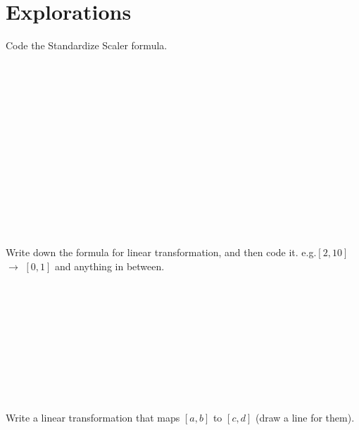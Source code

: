 \newpage
\section{Explorations}
\begin{outline}
    \1  Code the Standardize Scaler formula. \\
    \\
    \\
    \\
    \\
    \\
    \\
    \\
    \\
    \\
    \\
    \\
    \\
    \\
    \\
    \1  Write down the formula for linear transformation, and then code it. e.g.$[2,10]$ $\rightarrow$ $[0,1]$ and anything in between.\\
    \\
    \\
    \\
    \\
    \\
    \\
    \\
    \\
    \\
    \\
    \1 Write a linear transformation that maps $[a,b]$ to $[c,d]$ (draw a line for them). \\
    

\end{outline}
